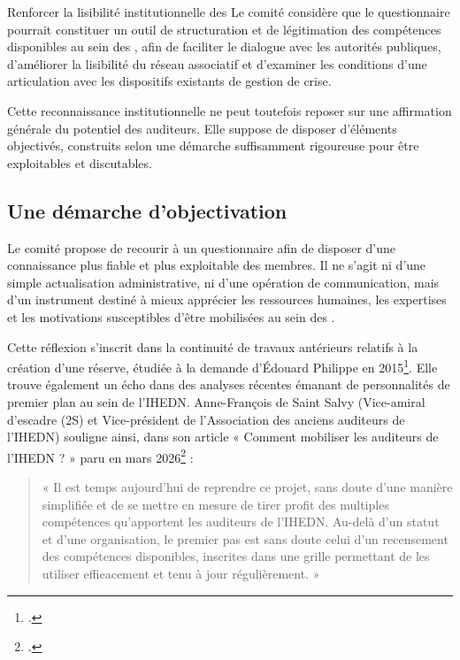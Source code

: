 \begin{subproposition}{Renforcer la lisibilité institutionnelle des \AssociationsUnionIHEDN}
Le comité considère que le questionnaire pourrait constituer un outil de structuration et de légitimation des compétences disponibles au sein des \AssociationsUnionIHEDN, afin de faciliter le dialogue avec les autorités publiques, d'améliorer la lisibilité du réseau associatif et d'examiner les conditions d'une articulation avec les dispositifs existants de gestion de crise.
\end{subproposition}

Cette reconnaissance institutionnelle ne peut toutefois reposer sur une affirmation générale du potentiel des auditeurs. Elle suppose de disposer d'éléments objectivés, construits selon une démarche suffisamment rigoureuse pour être exploitables et discutables.

\subsection{Une démarche d'objectivation}

Le comité propose de recourir à un questionnaire afin de disposer d'une connaissance plus fiable et plus exploitable des membres. Il ne s'agit ni d'une simple actualisation administrative, ni d'une opération de communication, mais d'un instrument destiné à mieux apprécier les ressources humaines, les expertises et les motivations susceptibles d'être mobilisées au sein des \AssociationsUnionIHEDN.

Cette réflexion s'inscrit dans la continuité de travaux antérieurs relatifs à la création d'une réserve, étudiée à la demande d'Édouard Philippe en 2015\footcite{DESAINTSALVY2026}. Elle trouve également un écho dans des analyses récentes émanant de personnalités de premier plan au sein de l'IHEDN. Anne-François de Saint Salvy (Vice-amiral d'escadre (2S) et Vice-président de l'Association des anciens auditeurs de l'IHEDN) souligne ainsi, dans son article « Comment mobiliser les auditeurs de l'IHEDN ? » paru en mars 2026\footcite{DESAINTSALVY2026} :

\begin{quote}
« Il est temps aujourd'hui de reprendre ce projet, sans doute d'une manière simplifiée et de se mettre en mesure de tirer profit des multiples compétences qu'apportent les auditeurs de l'IHEDN. Au-delà d'un statut et d'une organisation, le premier pas est sans doute celui d'un recensement des compétences disponibles, inscrites dans une grille permettant de les utiliser efficacement et tenu à jour régulièrement. »
\end{quote}


